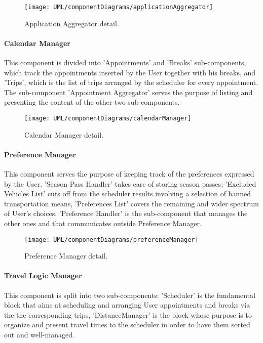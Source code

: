 		\begin{figure}[H]
			\centering
			\texttt{[image: UML/componentDiagrams/applicationAggregator]}
			\caption{Application Aggregator detail.}
			\label{applicationAggregatorDetail}
		\end{figure}
 
 
	\paragraph{Calendar Manager}
		This component is divided into 'Appointments' and 'Breaks' sub-components, which track the appointments inserted by the User together with his breaks, and 'Trips', which is the list of trips arranged by the scheduler for every appointment. The sub-component 'Appointment Aggregator' serves the purpose of listing and presenting the content of the other two sub-components.
	
		\begin{figure}[H]
			\centering
			\texttt{[image: UML/componentDiagrams/calendarManager]}
			\caption{Calendar Manager detail.}
			\label{calendarManagerDetail}
		\end{figure}
 

	\paragraph{Preference Manager}
		This component serves the purpose of keeping track of the preferences expressed by the User. 'Season Pass Handler' takes care of storing season passes; 'Excluded Vehicles List' cuts off from the scheduler results involving a selection of banned transportation means, 'Preferences List' covers the remaining and wider spectrum of User's choices. 'Preference Handler' is the sub-component that manages the other ones and that communicates outside Preference Manager.

		\begin{figure}[H]
			\centering
			\texttt{[image: UML/componentDiagrams/preferenceManager]}
			\caption{Preference Manager detail.}
			\label{preferenceManagerDetail}
		\end{figure}


	\paragraph{Travel Logic Manager}
		This component is split into two sub-components: 'Scheduler' is the fundamental block that aims at scheduling and arranging User appointments and breaks via the the corresponding trips, 'DistanceManager' is the block whose purpose is to organize and present travel times to the scheduler in order to have them sorted out and well-managed.

